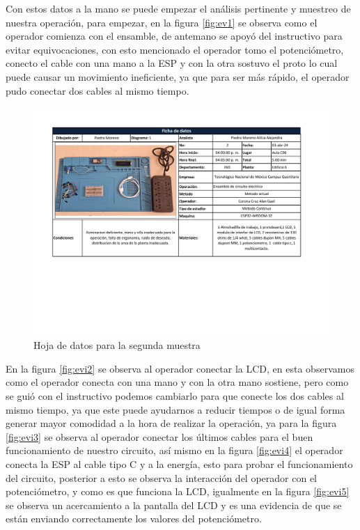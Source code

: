     
     Con estos datos a la mano se puede empezar el análisis pertinente y muestreo de nuestra operación, para empezar, en la figura \ref{fig:ev1} se observa como el operador comienza con el ensamble, de antemano se apoyó del instructivo para evitar equivocaciones, con esto mencionado el operador tomo el potenciómetro, conecto el cable con una mano a la ESP y con la otra sostuvo el proto lo cual puede causar un movimiento ineficiente, ya que para ser más rápido, el operador pudo conectar dos cables al mismo tiempo.
    
    \begin{figure}[H]
        \centering
        \includegraphics[trim = {17mm 70mm 25mm 15mm},clip,scale=0.36]{22/Img/hojaDeDatos2.pdf}
        \caption{Hoja de datos para la segunda muestra}
        \label{fig:hoja2}
    \end{figure}
    
     
    En la figura \ref{fig:evi2} se observa al operador conectar la LCD, en esta observamos como el operador conecta con una mano y con la otra mano sostiene, pero como se guió con el instructivo podemos cambiarlo para que conecte los dos cables al mismo tiempo, ya que este puede ayudarnos a reducir tiempos o de igual forma generar mayor comodidad a la hora de realizar la operación, ya para la figura \ref{fig:evi3} se observa  al operador conectar los últimos cables para el buen funcionamiento de nuestro circuito, así mismo en la figura \ref{fig:evi4} el operador conecta la ESP al cable tipo C y a la energía, esto para probar el funcionamiento del circuito, posterior a esto se observa la interacción del operador con el potenciómetro, y como es que funciona la LCD, igualmente en la figura \ref{fig:evi5} se observa un acercamiento a la pantalla del LCD y es una evidencia de que se están enviando correctamente los valores del potenciómetro.
    
